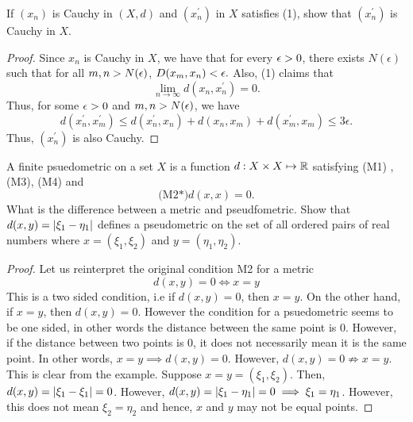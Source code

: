 \begin{question}
    If $(x_n)$ is Cauchy in $(X,d)$ and $(x_n^\prime)$ in $X$ satisfies (1), show that $(x_n^\prime)$ is Cauchy in $X$.
    \label{section1.6-12}
\end{question}
\begin{proof}
    Since $x_n$ is Cauchy in $X$, we have that for every $\epsilon > 0$, there exists $N(\epsilon)$ such that for all $m,n > N(\epsilon)$, $D(x_m , x_n) <\epsilon.$ Also, (1) claims that
    \[\lim_{n \rightarrow \infty} d(x_n , x_n^\prime) = 0.\]
    Thus, for some $\epsilon > 0$ and $m,n > N(\epsilon)$, we have
    \[d(x_n^\prime , x_m^\prime) \leq d(x_n^\prime , x_n) + d(x_n , x_m) + d(x_m^\prime , x_m) \leq 3\epsilon.\]
    Thus, $(x_n^\prime)$ is also Cauchy.
\end{proof}

\begin{question}
    A finite psuedometric on a set $X$ is a function $d : X \times X \mapsto \mathbb{R}$ satisfying (M1) , (M3), (M4) and
    \[\text{(M2*)} d(x,x) = 0.\]
    What is the difference between a metric and pseudfometric. Show that $d(x,y) = \left\lvert \xi_1 - \eta_1 \right\rvert$ defines a pseudometric on the set of all ordered pairs of real numbers where $x = (\xi_1 , \xi_2)$ and $y = (\eta_1 , \eta_2).$
    \label{section1.6-13}
\end{question}
\begin{proof}
    Let us reinterpret the original condition M2 for a metric
    \[d(x,y) = 0 \iff x = y\]
    This is a two sided condition, i.e if $d(x,y) = 0$, then $x = y$. On the other hand, if $x = y$, then $d(x,y) = 0$. However the condition for a psuedometric seems to be one sided, in other words the distance between the same point is $0$. However, if the distance between two points is $0$, it does not necessarily mean it is the same point. In other words, $x = y \implies d(x,y) = 0$. However, $d(x,y) = 0 \nRightarrow x = y$. This is clear from the example. Suppose $x = y = (\xi_1 , \xi_2)$. Then, $d(x,y) = \left\lvert \xi_1 - \xi_1 \right\rvert = 0$. However, $d(x,y) = \left\lvert \xi_1 - \eta_1 \right\rvert = 0 \implies \xi_1 = \eta_1$. However, this does not mean $\xi_2 = \eta_2$ and hence, $x$ and $y$ may not be equal points.
\end{proof}

